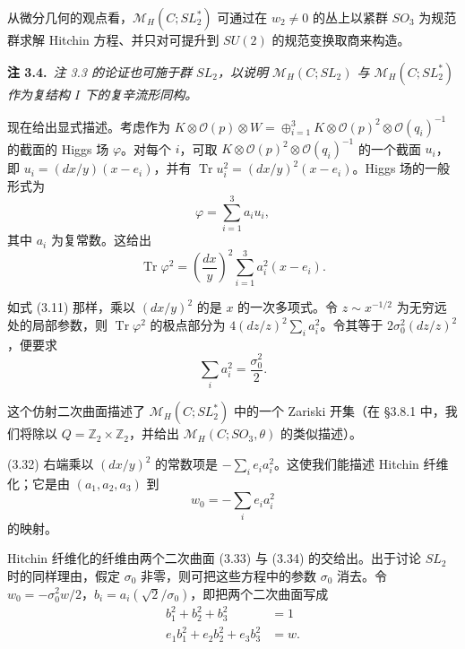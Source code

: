 \documentclass[11pt,a4paper]{article}
\newcommand{\Tr}{\operatorname{Tr}}
\begin{document}
从微分几何的观点看，$\mathcal{M}_H(C;SL_2^*)$ 可通过在 $w_2\ne0$ 的丛上以紧群 $SO_3$ 为规范群求解 Hitchin 方程、并只对可提升到 $SU(2)$ 的规范变换取商来构造。

\par\medskip
\noindent\textbf{注 3.4.}\ \textit{注 3.3 的论证也可施于群 $SL_2$，以说明 $\mathcal{M}_H(C;SL_2)$ 与 $\mathcal{M}_H(C;SL_2^*)$ 作为复结构 $I$ 下的复辛流形同构。}
\par\medskip

现在给出显式描述。考虑作为 $K\otimes\mathcal{O}(p)\otimes W=\oplus_{i=1}^3K\otimes\mathcal{O}(p)^2\otimes\mathcal{O}(q_i)^{-1}$ 的截面的 Higgs 场 $\varphi$。对每个 $i$，可取 $K\otimes\mathcal{O}(p)^2\otimes\mathcal{O}(q_i)^{-1}$ 的一个截面 $u_i$，即 $u_i=(dx/y)(x-e_i)$，并有 $\Tr u_i^2=(dx/y)^2(x-e_i)$。Higgs 场的一般形式为
\begin{equation}\tag{3.31}
\varphi=\sum_{i=1}^{3}a_iu_i,
\end{equation}
其中 $a_i$ 为复常数。这给出
\begin{equation}\tag{3.32}
\Tr\varphi^2=\left(\frac{dx}{y}\right)^2\sum_{i=1}^{3}a_i^2(x-e_i).
\end{equation}

如式 (3.11) 那样，乘以 $(dx/y)^2$ 的是 $x$ 的一次多项式。令 $z\sim x^{-1/2}$ 为无穷远处的局部参数，则 $\Tr\varphi^2$ 的极点部分为 $4(dz/z)^2\sum_i a_i^2$。令其等于 $2\sigma_0^2(dz/z)^2$，便要求
\begin{equation}\tag{3.33}
\sum_i a_i^2=\frac{\sigma_0^2}{2}.
\end{equation}

这个仿射二次曲面描述了 $\mathcal{M}_H(C;SL_2^*)$ 中的一个 Zariski 开集（在 §3.8.1 中，我们将除以 $Q=\mathbb{Z}_2\times\mathbb{Z}_2$，并给出 $\mathcal{M}_H(C;SO_3,\theta)$ 的类似描述）。

(3.32) 右端乘以 $(dx/y)^2$ 的常数项是 $-\sum_ie_ia_i^2$。这使我们能描述 Hitchin 纤维化；它是由 $(a_1,a_2,a_3)$ 到
\begin{equation}\tag{3.34}
w_0=-\sum_i e_ia_i^2
\end{equation}
的映射。

Hitchin 纤维化的纤维由两个二次曲面 (3.33) 与 (3.34) 的交给出。出于讨论 $SL_2$ 时的同样理由，假定 $\sigma_0$ 非零，则可把这些方程中的参数 $\sigma_0$ 消去。令 $w_0=-\sigma_0^2w/2$，$b_i=a_i(\sqrt2/\sigma_0)$，即把两个二次曲面写成
\begin{equation}\tag{3.35}
\begin{aligned}
b_1^2+b_2^2+b_3^2&=1\\
e_1b_1^2+e_2b_2^2+e_3b_3^2&=w.
\end{aligned}
\end{equation}
\end{document}
